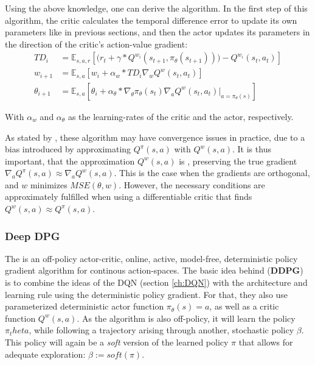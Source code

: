 \noindent Using the above knowledge, one can derive the  algorithm. In the first step of this algorithm, the critic calculates the temporal difference error to update its own parameters like in previous sections, and then the actor updates its parameters in the direction of the critic's action-value gradient:
\begin{align}
	TD_i    &= \mathds{E}_{s,a,r} \left[ \big( r_t + \gamma * Q^{w_i}(s_{t+1}, \pi_{\theta}(s_{t+1})) \big) - Q^{w_i}(s_t, a_t) \right] \label{eq:td_dpg}\\
	w_{i+1} &= \mathds{E}_{s,a} \left[  w_i + \alpha_w * TD_i \nabla_w Q^w(s_t, a_t) \right] \label{eq:critic_dpg} \\
	\theta_{i+1} &= \mathds{E}_{s,a} \left[ \theta_i + \alpha_\theta * \nabla_\theta \pi_\theta(s_t) \nabla_a Q^w(s_t,a_t) \big|_{a=\pi_\theta(s)} \right] \label{eq:actor_dpg}
\end{align}
\begin{flushright} \small With $\alpha_w$ and $\alpha_\theta$ as the learning-rates of the critic and the actor, respectively. \end{flushright}

As stated by \cite{silver_deterministic_2014}, these algorithm may have convergence issues in practice, due to a bias introduced by approximating $Q^\pi(s,a)$ with $Q^w(s,a)$. It is thus important, that the approximation $Q^w(s,a)$ is , preserving the true gradient $\nabla_a Q^\pi(s,a) \approx \nabla_a Q^w(s,a)$. This is the case when the gradients are orthogonal, and $w$ minimizes $MSE(\theta,w)$. However, the necessary conditions are approximately fulfilled when using a differentiable critic that finds $Q^w(s,a) \approx Q^\pi(s,a)$.


\subsubsection*{Deep DPG} \label{ch:ddpg}

The  is an off-policy actor-critic, online, active, model-free, deterministic policy gradient algorithm for continous action-spaces. The basic idea behind  (\textbf{DDPG})\cite{lillicrap_continuous_2015} is to combine the ideas of the DQN (section \ref{ch:DQN}) with the architecture and learning rule using the deterministic policy gradient. For that, they also use parameterized deterministic actor function $\pi_\theta(s) = a$, as well as a critic function $Q^w(s,a)$. As the algorithm is also off-policy, it will learn the policy $\pi_theta$, while following a trajectory arising through another, stochastic policy $\beta$. This policy will again be a \textit{soft} version of the learned policy $\pi$ that allows for adequate exploration: $\beta := soft(\pi)$.

